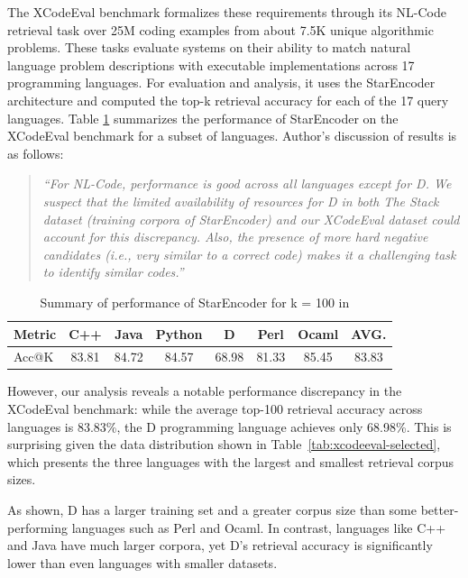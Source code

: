 \documentclass[12pt]{article}
\begin{document}
The XCodeEval benchmark \cite{Khan2023} formalizes these requirements through its NL-Code retrieval task over 25M coding examples from about 7.5K unique algorithmic problems. These tasks evaluate systems on their ability to match natural language problem descriptions with executable implementations across 17 programming languages. For evaluation and analysis, it uses the StarEncoder \cite{Li2023} architecture and computed the top-k retrieval accuracy for each of the 17 query languages. Table \ref{tab:xcodeeval-performance} summarizes the performance of StarEncoder on the XCodeEval benchmark for a subset of languages. Author's discussion of results is as follows:

\begin{quote}
\textit{``For NL-Code, performance is good across all languages except for D. We suspect that the limited availability of resources for D in both The Stack \cite{Kocetkov2022} dataset (training corpora of StarEncoder) and our XCodeEval dataset could account for this discrepancy. Also, the presence of more hard negative candidates (i.e., very similar to a correct code) makes it a challenging task to identify similar codes.''}~\cite{Khan2023}
\end{quote}

\begin{table}[ht]
\centering
\caption{Summary of performance of StarEncoder \cite{Li2023}
for k = 100 in ~\cite{Khan2023}}
\label{tab:xcodeeval-performance}
\begin{tabular}{lccccccc}
\hline
\textbf{Metric} & \textbf{C++} & \textbf{Java} & \textbf{Python} & \textbf{D} & \textbf{Perl} & \textbf{Ocaml} & \textbf{AVG.} \\
\hline
Acc@K & 83.81 & 84.72 & 84.57 & 68.98 & 81.33 & 85.45 & 83.83 \\
\hline
\end{tabular}
\end{table}

However, our analysis reveals a notable performance discrepancy in the XCodeEval benchmark: while the average top-100 retrieval accuracy across languages is 83.83\%, the D programming language achieves only 68.98\%. This is surprising given the data distribution shown in Table~\ref{tab:xcodeeval-selected}, which presents the three languages with the largest and smallest retrieval corpus sizes.

As shown, D has a larger training set and a greater corpus size than some better-performing languages such as Perl and Ocaml. In contrast, languages like C++ and Java have much larger corpora, yet D's retrieval accuracy is significantly lower than even languages with smaller datasets.
\end{document}
